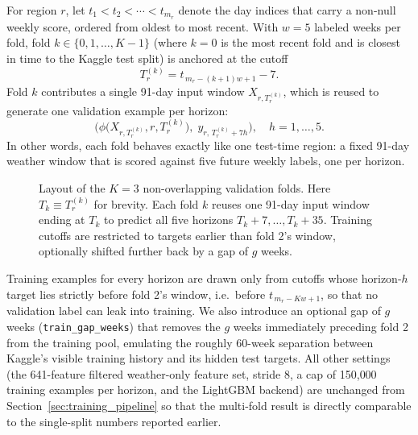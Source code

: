 \documentclass[conference]{IEEEtran}
\begin{document}
For region $r$, let $t_1 < t_2 < \cdots < t_{m_r}$ denote the day indices that
carry a non-null weekly score, ordered from oldest to most recent. With
$w=5$ labeled weeks per fold, fold $k \in \{0,1,\ldots,K-1\}$ (where $k=0$ is
the most recent fold and is closest in time to the Kaggle test split) is
anchored at the cutoff
\begin{equation}
T_r^{(k)} = t_{\,m_r-(k+1)w+1} - 7.
\end{equation}
Fold $k$ contributes a single 91-day input window $X_{r,T_r^{(k)}}$, which is
reused to generate one validation example per horizon:
\begin{equation}
\Big(\phi\big(X_{r,T_r^{(k)}}, r, T_r^{(k)}\big),\;
      y_{r,\,T_r^{(k)}+7h}\Big), \quad h=1,\ldots,5.
\end{equation}
In other words, each fold behaves exactly like one test-time region: a fixed
91-day weather window that is scored against five future weekly labels, one
per horizon.

\begin{figure}[t]
\centering
{}
\caption{Layout of the $K=3$ non-overlapping validation folds. Here $T_k
\equiv T_r^{(k)}$ for brevity. Each fold $k$ reuses one 91-day input window
ending at $T_k$ to predict all five horizons $T_k{+}7,\ldots,T_k{+}35$.
Training cutoffs are restricted to targets earlier than fold 2's window,
optionally shifted further back by a gap of $g$ weeks.}
\label{fig:multi_fold_layout}
\end{figure}

Training examples for every horizon are drawn only from cutoffs whose
horizon-$h$ target lies strictly before fold 2's window, i.e.\ before
$t_{\,m_r-Kw+1}$, so that no validation label can leak into training. We also
introduce an optional gap of $g$ weeks (\texttt{train\_gap\_weeks}) that
removes the $g$ weeks immediately preceding fold 2 from the training pool,
emulating the roughly 60-week separation between Kaggle's visible training
history and its hidden test targets. All other settings (the 641-feature
filtered weather-only feature set, stride 8, a cap of 150{,}000 training
examples per horizon, and the LightGBM backend) are unchanged from
Section~\ref{sec:training_pipeline} so that the multi-fold result is directly
comparable to the single-split numbers reported earlier.
\end{document}
